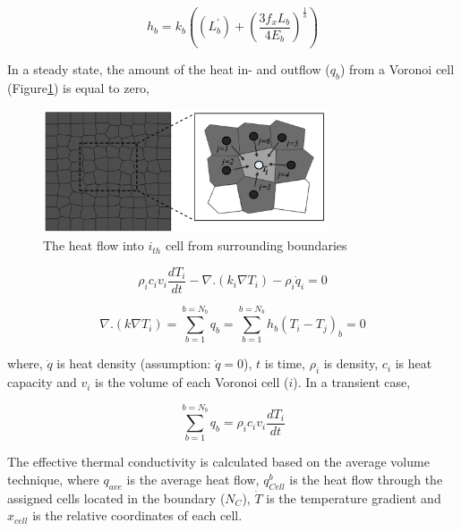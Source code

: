 \begin{equation}
\label{eq:LEM_Thermal_1}
h_b = k_{b} \left( (L_b^\prime)+ \left(\frac{3f_x L_b}{4E_b}\right)^\frac{1}{3} \right)
\end{equation}

In a steady state, the amount of the heat in- and outflow ($q_b$) from a Voronoi cell (Figure\ref{fig:Amir_LEM_Thermal}) is equal to zero,

\begin{figure}[!ht]
\centering
\includegraphics[width=0.75\textwidth]{figures/Amir_LEM_Thermal.png}
\caption{The heat flow into $i_{th}$ cell from surrounding boundaries}
\label{fig:Amir_LEM_Thermal}
\end{figure}


\begin{equation}
\label{eq:LEM_Thermal_2}
\rho_{i}c_{i}v_{i}\frac{dT_{i}}{dt}-\nabla .\left(k_i\nabla T_i\right)-\rho_i{\dot{q}}_i=0
\end{equation}

\begin{equation}
\label{eq:LEM_Thermal_3}
\nabla .\left(k\nabla T_i\right)=\sum_{b=1}^{b=N_b}{q_b}=\sum_{b=1}^{b=N_b}{h_b(T_i - T_j)_b=0}
\end{equation}

 
where, $\dot{q}$ is heat density (assumption: $\dot{q}=0$), $t$ is time, $\rho_{i}$ is density, $c_{i}$ is heat capacity and $v_{i}$ is the volume of each Voronoi cell ($i$). In a transient case,

\begin{equation}
\label{eq:LEM_Thermal_4}
\sum_{b=1}^{b=N_b}{q_b=}\rho_{i}c_{i}v_{i}\frac{dT_i}{dt}
\end{equation}

The effective thermal conductivity is calculated based on the average volume technique, where $q_{ave}$ is the average heat flow, $q_{Cell}^{b}$ is the heat flow through the assigned cells located in the boundary ($N_C$), $\dot{T}$ is the temperature gradient and  $\hat{x}_{cell}$ is the relative coordinates of each cell.

